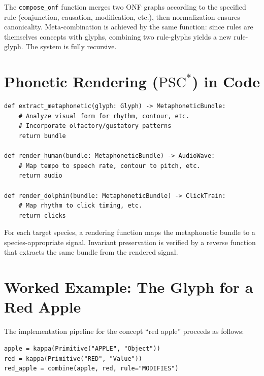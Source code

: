 \documentclass[12pt, letterpaper]{book}
\begin{document}
The \texttt{compose\_onf} function merges two ONF graphs according to the specified rule (conjunction, causation, modification, etc.), then normalization ensures canonicality. Meta-combination is achieved by the same function: since rules are themselves concepts with glyphs, combining two rule-glyphs yields a new rule-glyph. The system is fully recursive.

\section{Phonetic Rendering ($\mathrm{PSC}^*$) in Code}

\begin{lstlisting}
def extract_metaphonetic(glyph: Glyph) -> MetaphoneticBundle:
    # Analyze visual form for rhythm, contour, etc.
    # Incorporate olfactory/gustatory patterns
    return bundle

def render_human(bundle: MetaphoneticBundle) -> AudioWave:
    # Map tempo to speech rate, contour to pitch, etc.
    return audio

def render_dolphin(bundle: MetaphoneticBundle) -> ClickTrain:
    # Map rhythm to click timing, etc.
    return clicks
\end{lstlisting}

For each target species, a rendering function maps the metaphonetic bundle to a species-appropriate signal. Invariant preservation is verified by a reverse function that extracts the same bundle from the rendered signal.

\section{Worked Example: The Glyph for a Red Apple}

The implementation pipeline for the concept ``red apple'' proceeds as follows:

\begin{lstlisting}
apple = kappa(Primitive("APPLE", "Object"))
red = kappa(Primitive("RED", "Value"))
red_apple = combine(apple, red, rule="MODIFIES")
\end{lstlisting}
\end{document}
